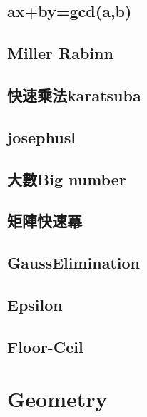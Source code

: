 \subsection{ax+by=gcd(a,b)}


\subsection{Miller Rabinn}


\subsection{快速乘法karatsuba}


\clearpage

\subsection{josephusl}


\subsection{大數Big number}


\subsection{矩陣快速冪}


\subsection{GaussElimination}


\subsection{Epsilon}


\subsection{Floor-Ceil}


\section{Geometry}

